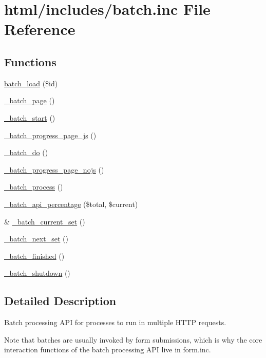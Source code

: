 \hypertarget{batch_8inc}{
\section{html/includes/batch.inc File Reference}
\label{batch_8inc}
}
\subsection*{Functions}
\begin{DoxyCompactItemize}
\item 
\hyperlink{batch_8inc_a43cd9cb0044756355a8e3c68356fbb16}{batch\_\-load} (\$id)
\item 
\hyperlink{batch_8inc_a5535c7cfeae572bda2c11f3e597a55b6}{\_\-batch\_\-page} ()
\item 
\hyperlink{batch_8inc_a1d38b90eeddc5da76b02e87fb6158ed1}{\_\-batch\_\-start} ()
\item 
\hyperlink{batch_8inc_ac8152d29181479967c4bdc7e0caf920e}{\_\-batch\_\-progress\_\-page\_\-js} ()
\item 
\hyperlink{batch_8inc_a200def74deec79748ee5accf5117db6d}{\_\-batch\_\-do} ()
\item 
\hyperlink{batch_8inc_ab233b667c1237a8e177e1e6aa1b890ba}{\_\-batch\_\-progress\_\-page\_\-nojs} ()
\item 
\hyperlink{batch_8inc_af411ff0cae660684809c5f6a8dbc0353}{\_\-batch\_\-process} ()
\item 
\hyperlink{batch_8inc_a0e08303b9f24da1acff2fd1b41a7bc32}{\_\-batch\_\-api\_\-percentage} (\$total, \$current)
\item 
\& \hyperlink{batch_8inc_a1a536764a1a9bf283bcceddc03b462d7}{\_\-batch\_\-current\_\-set} ()
\item 
\hyperlink{batch_8inc_a48dd7f59b745d8e01fce39996d0c826e}{\_\-batch\_\-next\_\-set} ()
\item 
\hyperlink{batch_8inc_a7e7b4cbc351842ca1b27cc780b0f219b}{\_\-batch\_\-finished} ()
\item 
\hyperlink{batch_8inc_a85d830f44fb762da6e9fdb838180c85f}{\_\-batch\_\-shutdown} ()
\end{DoxyCompactItemize}


\subsection{Detailed Description}
Batch processing API for processes to run in multiple HTTP requests.

Note that batches are usually invoked by form submissions, which is why the core interaction functions of the batch processing API live in form.inc.

